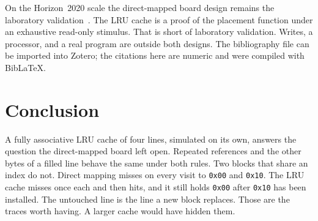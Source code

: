 \documentclass[a4paper,11pt,oneside,headings=small,parskip=half,titlepage=false]{scrreprt}
\begin{document}
On the Horizon~2020 scale the direct-mapped board design remains the laboratory validation~\cite{ectrl}. The LRU cache is a proof of the placement function under an exhaustive read-only stimulus. That is short of laboratory validation. Writes, a processor, and a real program are outside both designs. The bibliography file can be imported into Zotero; the citations here are numeric and were compiled with BibLaTeX.

\chapter{Conclusion}

A fully associative LRU cache of four lines, simulated on its own, answers the question the direct-mapped board left open. Repeated references and the other bytes of a filled line behave the same under both rules. Two blocks that share an index do not. Direct mapping misses on every visit to \texttt{0x00} and \texttt{0x10}. The LRU cache misses once each and then hits, and it still holds \texttt{0x00} after \texttt{0x10} has been installed. The untouched line is the line a new block replaces. Those are the traces worth having. A larger cache would have hidden them.

\printbibliography[heading=bibintoc]
\end{document}
